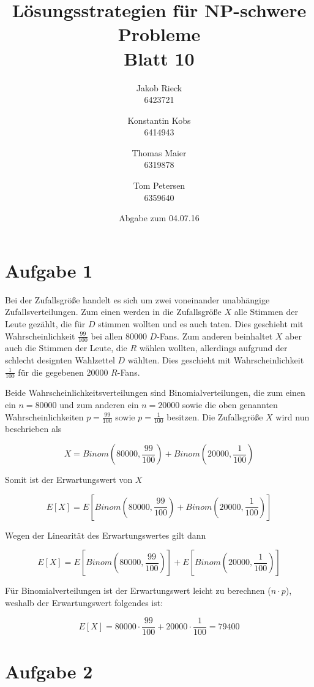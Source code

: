 \documentclass[12pt,a4paper]{article}
\title{Lösungsstrategien für NP-schwere Probleme\\Blatt 10}
\author{
		Jakob Rieck\\
		\small{6423721}
	\and
		Konstantin Kobs\\
		\small{6414943}
	\and
		Thomas Maier\\
		\small{6319878}
	\and
		Tom Petersen\\
		\small{6359640}
}
\date{Abgabe zum 04.07.16}
\begin{document}
\maketitle

\section*{Aufgabe 1}

Bei der Zufallsgröße handelt es sich um zwei voneinander unabhängige Zufallsverteilungen. Zum einen werden in die Zufallsgröße $X$ alle Stimmen der Leute gezählt, die für $D$ stimmen wollten und es auch taten. Dies geschieht mit Wahrscheinlichkeit $\frac{99}{100}$ bei allen 80000 $D$-Fans. Zum anderen beinhaltet $X$ aber auch die Stimmen der Leute, die $R$ wählen wollten, allerdings aufgrund der schlecht designten Wahlzettel $D$ wählten. Dies geschieht mit Wahrscheinlichkeit $\frac{1}{100}$ für die gegebenen 20000 $R$-Fans.

Beide Wahrscheinlichkeitsverteilungen sind Binomialverteilungen, die zum einen ein $n=80000$ und zum anderen ein $n=20000$ sowie die oben genannten Wahrscheinlichkeiten $p=\frac{99}{100}$ sowie $p=\frac{1}{100}$ besitzen. Die Zufallsgröße $X$ wird nun beschrieben als

$$X = Binom(80000, \frac{99}{100}) + Binom(20000, \frac{1}{100})$$

Somit ist der Erwartungswert von $X$

$$E[X] = E[Binom(80000, \frac{99}{100}) + Binom(20000, \frac{1}{100})]$$

Wegen der Linearität des Erwartungswertes gilt dann

$$E[X] = E[Binom(80000, \frac{99}{100})] + E[Binom(20000, \frac{1}{100})]$$

Für Binomialverteilungen ist der Erwartungswert leicht zu berechnen ($n \cdot p$), weshalb der Erwartungswert folgendes ist:

$$E[X] = 80000 \cdot \frac{99}{100} + 20000 \cdot \frac{1}{100} = 79400$$


\section*{Aufgabe 2}
\end{document}
